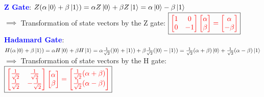\documentclass{book}
\begin{document}
\vspace{2mm}
\textcolor{blue}{\textbf{Z Gate}}: \( Z(\alpha \ket{0} + \beta \ket{1}) = \alpha Z\ket{0} + \beta Z\ket{1} = \alpha\ket{0} - \beta\ket{1} \)\\
\hspace{1.5cm} $\implies$ Transformation of state vectors by the Z gate: $\boxed{\textcolor{red}{\begin{bmatrix} 1 & 0 \\ 0 & -1 \end{bmatrix} \begin{bmatrix} \alpha \\ \beta \end{bmatrix} = \begin{bmatrix} \alpha \\ -\beta \end{bmatrix}}}$\\
\vspace{2mm}
\textcolor{blue}{\textbf{Hadamard Gate}}: \( H(\alpha \ket{0} + \beta \ket{1}) = \alpha H\ket{0} + \beta H\ket{1} = \alpha\frac{1}{\sqrt{2}}(\ket{0} + \ket{1}) + \beta\frac{1}{\sqrt{2}}(\ket{0} - \ket{1}) = \frac{1}{\sqrt{2}}(\alpha + \beta)\ket{0} + \frac{1}{\sqrt{2}}(\alpha - \beta)\ket{1} \)\\
\hspace{3cm} $\implies$ Transformation of state vectors by the H gate: $\boxed{\textcolor{red}{\begin{bmatrix} \frac{1}{\sqrt{2}} & \frac{1}{\sqrt{2}} \\ \frac{1}{\sqrt{2}} & -\frac{1}{\sqrt{2}} \end{bmatrix} \begin{bmatrix} \alpha \\ \beta \end{bmatrix} = \begin{bmatrix} \frac{1}{\sqrt{2}}(\alpha + \beta) \\ \frac{1}{\sqrt{2}}(\alpha - \beta) \end{bmatrix}}}$\\
\end{document}

